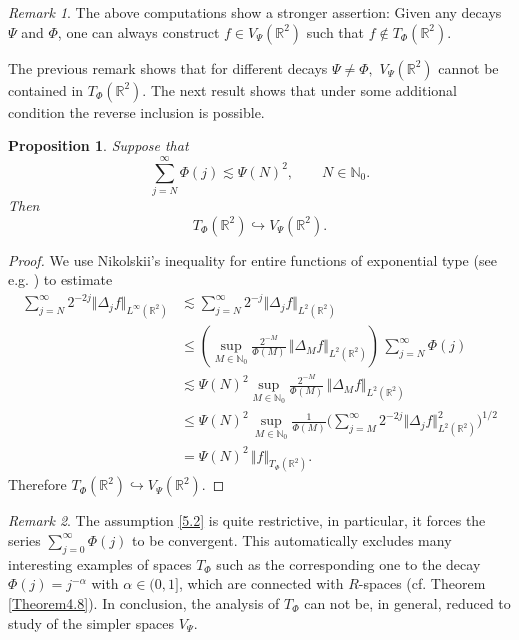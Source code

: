 \documentclass[11pt, a4paper,leqno]{amsart}
\theoremstyle{plain}
\newtheorem{proposition}{Proposition}
\numberwithin{equation}{section}
\theoremstyle{definition}
\theoremstyle{remark}
\newtheorem{remark}{Remark}
\begin{document}
\begin{remark}
\label{Remark5.1} The above computations show a stronger assertion: Given any
decays $\Psi$ and $\Phi$, one can always construct $f\in V_{\Psi}%
(\mathbb{R}^{2})$ such that $f\not \in T_{\Phi}(\mathbb{R}^{2})$.
\end{remark}

The previous remark shows that for different decays $\Psi\neq\Phi,$ $V_{\Psi
}(\mathbb{R}^{2})$ cannot be contained in $T_{\Phi}(\mathbb{R}^{2}).$ The next
result shows that under some additional condition the reverse inclusion is
possible. 

\begin{proposition}
Suppose that
\begin{equation}
\sum_{j=N}^{\infty}\Phi(j)\lesssim\Psi(N)^{2},\qquad N\in\mathbb{N}_{0}.
\label{5.2}%
\end{equation}
Then
\[
T_{\Phi}(\mathbb{R}^{2})\hookrightarrow V_{\Psi}(\mathbb{R}^{2}).
\]

\end{proposition}

\begin{proof}
We use Nikolskii's inequality for entire functions of exponential type (see e.g. \cite[Section 4.9.53]{Timan}) to
estimate
\begin{align*}
\sum_{j=N}^{\infty}2^{-2j}\Vert\Delta_{j}f\Vert_{L^{\infty}(\mathbb{R}^{2})}
&  \lesssim\sum_{j=N}^{\infty}2^{-j}\Vert\Delta_{j}f\Vert_{L^{2}%
(\mathbb{R}^{2})}\\
&  \leq\left(  \sup_{M\in\mathbb{N}_{0}}\frac{2^{-M}}{\Phi(M)}\,\Vert
\Delta_{M}f\Vert_{L^{2}(\mathbb{R}^{2})}\right)  \,\sum_{j=N}^{\infty}%
\Phi(j)\\
&  \lesssim \Psi(N)^{2}  \sup_{M\in\mathbb{N}_{0}}\frac{2^{-M}}{\Phi(M)}%
\,\Vert\Delta_{M}f\Vert_{L^{2}(\mathbb{R}^{2})} \\
&  \leq \Psi(N)^{2}\,\sup_{M\in\mathbb{N}_{0}}\frac{1}{\Phi(M)}%
\bigg(\sum_{j=M}^{\infty}2^{-2j}\Vert\Delta_{j}f\Vert_{L^{2}(\mathbb{R}^{2}%
)}^{2}\bigg)^{1/2}\\
&  =\Psi(N)^{2}\,\Vert f\Vert_{T_{\Phi}(\mathbb{R}^{2})}.
\end{align*}
Therefore $T_{\Phi}(\mathbb{R}^{2})\hookrightarrow V_{\Psi}(\mathbb{R}^{2})$.
\end{proof}

\begin{remark}
The assumption \eqref{5.2} is quite restrictive, in particular, it forces the
series $\sum_{j=0}^{\infty}\Phi(j)$ to be convergent. This automatically
excludes many interesting examples of spaces $T_{\Phi}$ such as the
corresponding one to the decay $\Phi(j)=j^{-\alpha}$ with $\alpha\in(0,1]$,
which are connected with $R$-spaces (cf. Theorem \ref{Theorem4.8}). In
conclusion, the analysis of $T_{\Phi}$ can not be, in general, reduced to
study of the simpler spaces $V_{\Psi}$.
\end{remark}
\end{document}
